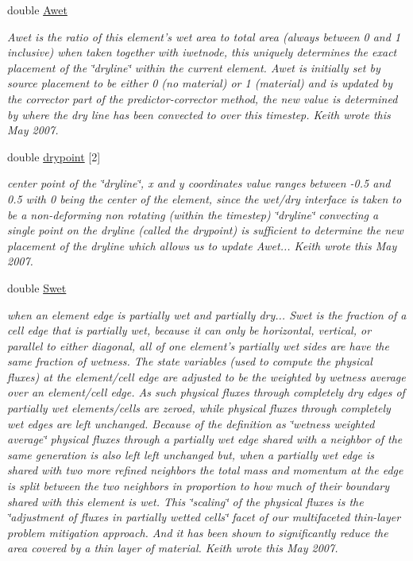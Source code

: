 \begin{CompactItemize}
double \hyperlink{classElement_r51}{Awet}
\begin{CompactList}\small\item\em Awet is the ratio of this element's wet area to total area (always between 0 and 1 inclusive) when taken together with iwetnode, this uniquely determines the exact placement of the \char`\"{}dryline\char`\"{} within the current element. Awet is initially set by source placement to be either 0 (no material) or 1 (material) and is updated by the corrector part of the predictor-corrector method, the new value is determined by where the dry line has been convected to over this timestep. Keith wrote this May 2007. \item\end{CompactList}\item 
double \hyperlink{classElement_r52}{drypoint} \mbox{[}2\mbox{]}
\begin{CompactList}\small\item\em center point of the \char`\"{}dryline\char`\"{}, x and y coordinates value ranges between -0.5 and 0.5 with 0 being the center of the element, since the wet/dry interface is taken to be a non-deforming non rotating (within the timestep) \char`\"{}dryline\char`\"{} convecting a single point on the dryline (called the drypoint) is sufficient to determine the new placement of the dryline which allows us to update Awet... Keith wrote this May 2007. \item\end{CompactList}\item 
double \hyperlink{classElement_r53}{Swet}
\begin{CompactList}\small\item\em when an element edge is partially wet and partially dry... Swet is the fraction of a cell edge that is partially wet, because it can only be horizontal, vertical, or parallel to either diagonal, all of one element's partially wet sides are have the same fraction of wetness. The state variables (used to compute the physical fluxes) at the element/cell edge are adjusted to be the weighted by wetness average over an element/cell edge. As such physical fluxes through completely dry edges of partially wet elements/cells are zeroed, while physical fluxes through completely wet edges are left unchanged. Because of the definition as \char`\"{}wetness weighted average\char`\"{} physical fluxes through a partially wet edge shared with a neighbor of the same generation is also left left unchanged but, when a partially wet edge is shared with two more refined neighbors the total mass and momentum at the edge is split between the two neighbors in proportion to how much of their boundary shared with this element is wet. This \char`\"{}scaling\char`\"{} of the physical fluxes is the \char`\"{}adjustment of fluxes in partially wetted cells\char`\"{} facet of our multifaceted thin-layer problem mitigation approach. And it has been shown to significantly reduce the area covered by a thin layer of material. Keith wrote this May 2007. \item\end{CompactList}\end{CompactItemize}
